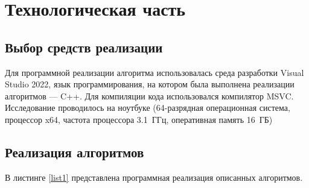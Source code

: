 \chapter{Технологическая часть}

\section{Выбор средств реализации}
Для программной реализации алгоритма использовалась среда разработки Visual Studio 2022, язык программирования, на котором была выполнена реализации алгоритмов --- C++.
Для компиляции кода использовался компилятор MSVC. Исследование проводилось на ноутбуке (64-разрядная операционная система, процессор x64, частота процессора 3.1~ГГц, оперативная память 16~ГБ)
\section{Реализация алгоритмов}
В листинге \ref{list1} представлена программная реализация описанных алгоритмов.
